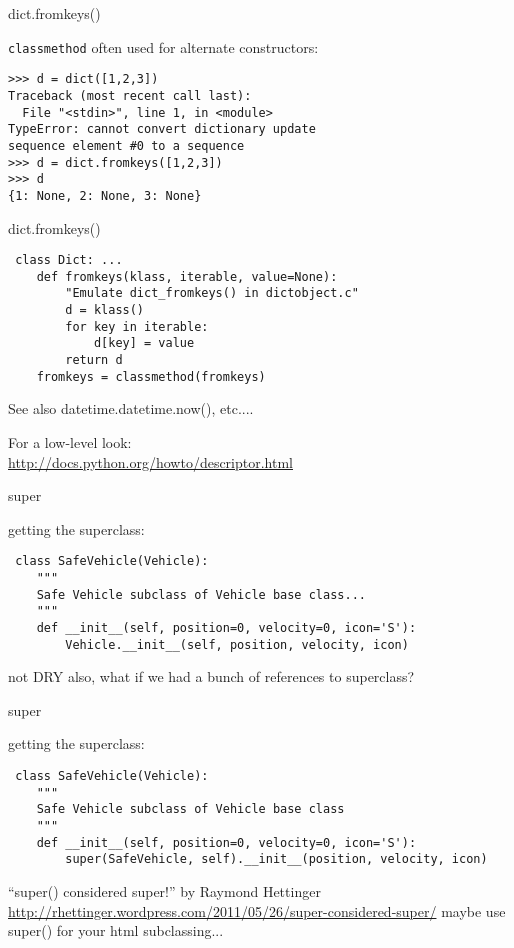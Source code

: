 \documentclass{beamer}
\begin{document}
\begin{frame}[fragile]{dict.fromkeys()}

{ \Large \verb|classmethod| often used for alternate constructors:}

\begin{verbatim}
>>> d = dict([1,2,3])
Traceback (most recent call last):
  File "<stdin>", line 1, in <module>
TypeError: cannot convert dictionary update
sequence element #0 to a sequence
>>> d = dict.fromkeys([1,2,3])
>>> d
{1: None, 2: None, 3: None}
\end{verbatim}

\end{frame} 

\begin{frame}[fragile]{dict.fromkeys()}

\begin{verbatim}
￼class Dict: ...
    def fromkeys(klass, iterable, value=None):
        "Emulate dict_fromkeys() in dictobject.c"
        d = klass()
        for key in iterable:
            d[key] = value
        return d
    fromkeys = classmethod(fromkeys)
\end{verbatim}

\vfill
{\Large See also datetime.datetime.now(), etc....}

\vfill
For a low-level look:\\
\url{http://docs.python.org/howto/descriptor.html}

\end{frame} 

\begin{frame}[fragile]{super}

{\Large getting the superclass:}
\begin{verbatim}
￼class SafeVehicle(Vehicle):
    """
    Safe Vehicle subclass of Vehicle base class...
    """
    def __init__(self, position=0, velocity=0, icon='S'):
        Vehicle.__init__(self, position, velocity, icon)
\end{verbatim}

{\Large
\vfill
not DRY
\vfill
also, what if we had a bunch of references to superclass?
}
\end{frame} 

\begin{frame}[fragile]{super}

{\Large getting the superclass:}
\begin{verbatim}
￼class SafeVehicle(Vehicle):
    """
    Safe Vehicle subclass of Vehicle base class
    """
    def __init__(self, position=0, velocity=0, icon='S'):
        super(SafeVehicle, self).__init__(position, velocity, icon)
\end{verbatim}

\vfill
{\Large ``super() considered super!'' by Raymond Hettinger }
\vfill
\url{http://rhettinger.wordpress.com/2011/05/26/super-considered-super/}
\vfill
 maybe use super() for your html subclassing...
\end{frame} 
\end{document}
